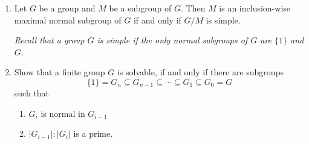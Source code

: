 \documentclass[12pt,a4paper]{article}
\begin{document}
\begin{enumerate}
\item
  Let $G$ be a group and $M$ be a subgroup of $G$. Then $M$ is an inclusion-wise maximal normal subgroup of $G$ if and only if $G/M$ is simple.

  \emph{Recall that a group $G$ is simple if the only normal subgroups of $G$ are $\{1\}$ and $G$.}
\item Show that a finite group $G$ is solvable, if and only if there are subgroups
  \begin{displaymath}
    \{1\} = G_n \subseteq G_{n-1} \subseteq \cdots \subseteq G_1 \subseteq G_0 = G  
  \end{displaymath}
  such that
  \begin{enumerate}[label = \alph*)]
  \item $G_i$ is normal in $G_{i-1}$
  \item $|G_{i-1}| : |G_i|$ is a prime. 
  \end{enumerate}
\end{enumerate}
\end{document}
